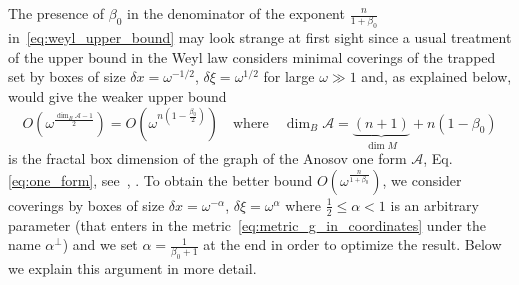 \documentclass[10pt]{amsart}
\theoremstyle{definition}\newtheorem{defi}[theo]{Definition}\newtheorem{rema}[theo]{Remark}\newtheorem{exam}[theo]{Example}\newtheorem{exem}[theo]{Example}\newtheorem{nota}[theo]{Notation}
\newcommand{\scrA}{\mathscr{A}}
\begin{document}
The presence of $\beta_{0}$ in the denominator of the exponent $\frac{n}{1+\beta_{0}}$ in~\eqref{eq:weyl_upper_bound} may look strange at first sight since a usual treatment of the upper bound in the Weyl law considers minimal coverings of the trapped set by boxes of size $\delta x=\omega^{-1/2}$, $\delta\xi=\omega^{1/2}$ for large $\omega\gg1$ and, as explained below, would give the weaker upper bound 
\[
O\left(\omega^{\frac{\dim_{B}\scrA-1}{2}}\right)=O\left(\omega^{n\left(1-\frac{\beta_{0}}{2}\right)}\right)\quad\text{where}\quad\dim_{B}\scrA=\underbrace{(n+1)}_{\dim M}+n(1-\beta_{0})
\]
is the fractal box dimension of the graph of the Anosov one form $\scrA$, Eq.\eqref{eq:one_form}, see~\cite[Chap.~11]{falconer_03_book}, \cite{Nonnenmacher_Zworski_14}. To obtain the better bound $O(\omega^{\frac{n}{1+\beta_{0}}})$, we consider coverings by boxes of size $\delta x=\omega^{-\alpha}$, $\delta\xi=\omega^{\alpha}$ where $\frac{1}{2}\leq\alpha<1$ is an arbitrary parameter (that enters in the metric~\eqref{eq:metric_g_in_coordinates} under the name $\alpha^{\perp}$) and we set $\alpha=\frac{1}{\beta_{0}+1}$ at the end in order to optimize the result. Below we explain this argument in more detail.
\end{document}
